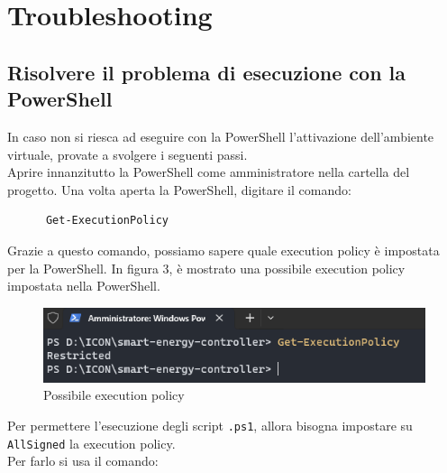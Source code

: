 \documentclass[12pt, letterpaper]{article}
\begin{document}




\section{Troubleshooting}

\subsection{Risolvere il problema di esecuzione con la PowerShell}
\label{sec:powershell-error}

In caso non si riesca ad eseguire con la PowerShell l'attivazione dell'ambiente
virtuale, provate a svolgere i seguenti passi. \\

\noindent Aprire innanzitutto la PowerShell come amministratore nella cartella del progetto.
Una volta aperta la PowerShell, digitare il comando:

\begin{verbatim}
      Get-ExecutionPolicy
\end{verbatim}

Grazie a questo comando, possiamo sapere quale execution policy è impostata per la PowerShell.
In figura 3, è mostrato una possibile execution policy impostata nella PowerShell. \\

\begin{figure}[h]
      \centering
      \includegraphics{powershell-error.png}
      \caption{Possibile execution policy}
\end{figure}

\noindent Per permettere l'esecuzione degli script \texttt{.ps1}, allora bisogna impostare
su \texttt{AllSigned} la execution policy. \\
\noindent Per farlo si usa il comando: \\
\end{document}
